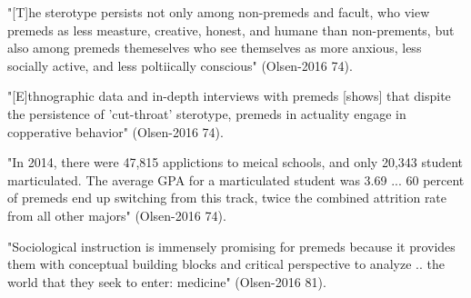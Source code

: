 "[T]he sterotype persists not only among non-premeds and facult, who view premeds as less measture, creative, honest, and humane than non-prements, but also among premeds themeselves who see themselves as more anxious, less socially active, and less poltiically conscious" (Olsen-2016 74).

"[E]thnographic data and in-depth interviews with premeds [shows] that dispite the persistence of 'cut-throat' sterotype, premeds in actuality engage in copperative behavior" (Olsen-2016 74).

"In 2014, there were 47,815 applictions to meical schools, and only 20,343 student marticulated. The average GPA for a marticulated student was 3.69 ... 60 percent of premeds end up switching from this track, twice the combined attrition rate from all other majors" (Olsen-2016 74).

"Sociological instruction is immensely promising for premeds because it provides them with conceptual building blocks and critical perspective to analyze .. the world that they seek to enter: medicine" (Olsen-2016 81).
